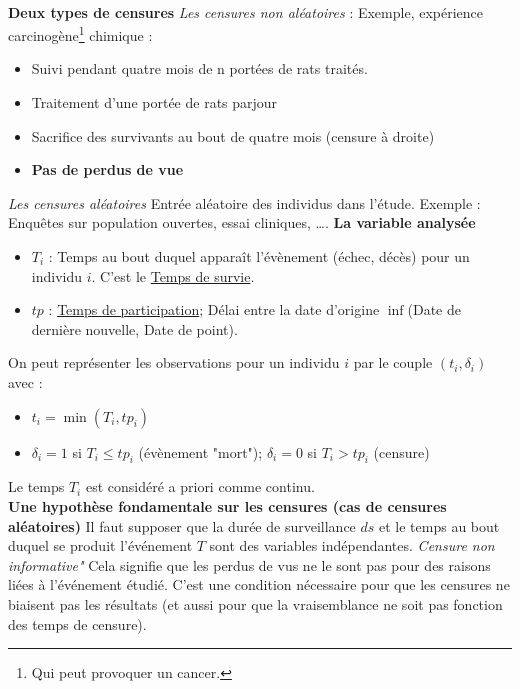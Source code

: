 \\
\textbf{Deux types de censures}\newline
\textit{Les censures non aléatoires} : Exemple, expérience carcinogène\footnote{Qui peut provoquer un cancer.} chimique :
\begin{itemize}
\item Suivi pendant quatre mois de n portées de rats traités.
\item Traitement d'une portée de rats parjour
\item Sacrifice des survivants au bout de quatre mois (censure à droite)
\item \textbf{Pas de perdus de vue}
\end{itemize}
\textit{Les censures aléatoires} Entrée aléatoire des individus dans l'étude. Exemple : Enquêtes sur population ouvertes, essai cliniques, \dots.
\textbf{La variable analysée}\newline
\begin{itemize}
\item $T_{i}$ : Temps au bout duquel apparaît l'évènement (échec, décès) pour un individu $i$. C'est le \underline{Temps de survie}.
\item $tp$ : \underline{Temps de participation}; Délai entre la date d'origine $\inf$(Date de dernière nouvelle, Date de point).
\end{itemize}
On peut représenter les observations pour un individu $i$ par le couple $(t_{i},\delta_{i})$ avec : 
\begin{itemize}
\item $t_{i} = \min(T_{i}, tp_{i})$
\item $\delta_{i} = 1$ si $T_{i}\leq tp_{i}$ (évènement "mort"); $\delta_{i} = 0$ si $T_{i} > tp_{i}$ (censure)
\end{itemize}
Le temps $T_{i}$ est considéré a priori comme continu.\newline
\\
\textbf{Une hypothèse fondamentale sur les censures (cas de censures aléatoires)}\newline
Il faut supposer que la durée de surveillance $ds$ et le temps au bout duquel se produit l'événement $T$ sont des variables indépendantes.\newline
\textit{Censure non informative"} Cela signifie que les perdus de vus ne le sont pas pour des raisons liées à l'événement étudié. C'est une condition nécessaire pour que les censures ne biaisent pas les résultats (et aussi pour que la vraisemblance ne soit pas fonction des temps de censure).\newline
